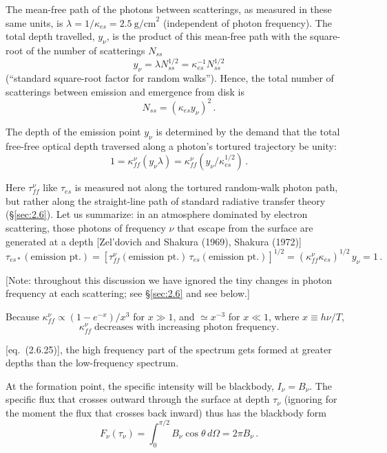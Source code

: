 The mean-free path of the photons between scatterings, as measured in these
same units, is $\lambda = 1/\kappa_{es} = 2.5~\text{g/cm}^2$ (independent of photon frequency).  The
total depth travelled, $y_\nu$, is the product of this mean-free path with the square-root
of the number of scatterings $N_{ss}$
%
\[
y_\nu = \lambda N_{ss}^{1/2} = \kappa_{es}^{-1} N_{ss}^{1/2}
\]
%
(``standard square-root factor for random walks'').  Hence, the total number of
scatterings between emission and emergence from disk is
%
\[
N_{ss} = (\kappa_{es} y_\nu)^2\,.
\]

The depth of the emission point $y_\nu$ is determined by the demand that the total
free-free optical depth traversed along a photon's tortured trajectory be unity:
%
\[
1 = \kappa_{ff}^{\nu}(y_\nu \lambda) = \kappa_{ff}^{\nu}(y_\nu / \kappa_{es}^{1/2})\,.
\]

Here $\tau_{ff}^{\nu}$ like $\tau_{es}$ is measured not along the tortured random-walk photon path,
but rather along the straight-line path of standard radiative transfer theory (\S\ref{sec:2.6}).
Let us summarize: in an atmosphere dominated by electron scattering, those
photons of frequency $\nu$ that escape from the surface are generated at a depth
[Zel'dovich and Shakura (1969), Shakura (1972)]
%
\begin{equation}
\tag{5.10.2}
\tau_{es*}(\text{emission pt.})
= [\tau_{ff}^{\nu}(\text{emission pt.})\,\tau_{es}(\text{emission pt.})]^{1/2}
= (\kappa_{ff}^{\nu}\kappa_{es})^{1/2}\,y_\nu = 1\,.
\end{equation}

[Note: throughout this discussion we have ignored the tiny changes in photon
frequency at each scattering; see \S\ref{sec:2.6} and see below.]

Because $\kappa_{ff}^{\nu} \propto (1 - e^{-x})/x^3$ for $x \gg 1$, and $\simeq x^{-3}$ for $x \ll 1$,
where $x \equiv h\nu/T$,
%
\begin{equation}
\tag{5.10.3}
\kappa_{ff}^{\nu} \; \text{decreases with increasing photon frequency.}
\end{equation}

[eq.\ (2.6.25)], the high frequency part of the spectrum gets formed at greater
depths than the low-frequency spectrum.

At the formation point, the specific intensity will be blackbody, $I_\nu = B_\nu$.  The
specific flux that crosses outward through the surface at depth $\tau_\nu$ (ignoring for
the moment the flux that crosses back inward) thus has the blackbody form
%
\[
F_\nu(\tau_\nu) = \int_0^{\pi/2} B_\nu \cos\theta \, d\Omega = 2\pi B_\nu\,.
\]

